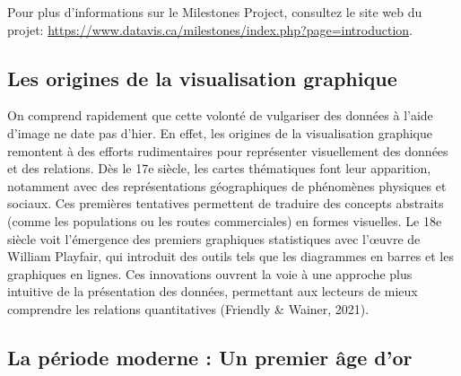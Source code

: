 \documentclass[
  letterpaper,
  DIV=11,
  numbers=noendperiod]{scrreprt}
\begin{document}
\begin{tcolorbox}[enhanced jigsaw, opacitybacktitle=0.6, colbacktitle=quarto-callout-note-color!10!white, arc=.35mm, toptitle=1mm, colframe=quarto-callout-note-color-frame, breakable, colback=white, toprule=.15mm, rightrule=.15mm, coltitle=black, bottomrule=.15mm, opacityback=0, titlerule=0mm, bottomtitle=1mm, title=\textcolor{quarto-callout-note-color}{\faInfo}\hspace{0.5em}{Note}, leftrule=.75mm, left=2mm]

Pour plus d'informations sur le Milestones Project, consultez le site
web du projet:
\url{https://www.datavis.ca/milestones/index.php?page=introduction}.

\end{tcolorbox}

\hypertarget{les-origines-de-la-visualisation-graphique}{%
\subsection{Les origines de la visualisation
graphique}\label{les-origines-de-la-visualisation-graphique}}

On comprend rapidement que cette volonté de vulgariser des données à
l'aide d'image ne date pas d'hier. En effet, les origines de la
visualisation graphique remontent à des efforts rudimentaires pour
représenter visuellement des données et des relations. Dès le 17e
siècle, les cartes thématiques font leur apparition, notamment avec des
représentations géographiques de phénomènes physiques et sociaux. Ces
premières tentatives permettent de traduire des concepts abstraits
(comme les populations ou les routes commerciales) en formes visuelles.
Le 18e siècle voit l'émergence des premiers graphiques statistiques avec
l'œuvre de William Playfair, qui introduit des outils tels que les
diagrammes en barres et les graphiques en lignes. Ces innovations
ouvrent la voie à une approche plus intuitive de la présentation des
données, permettant aux lecteurs de mieux comprendre les relations
quantitatives (Friendly \& Wainer, 2021).

\hypertarget{la-puxe9riode-moderne-un-premier-uxe2ge-dor}{%
\subsection{La période moderne : Un premier âge
d'or}\label{la-puxe9riode-moderne-un-premier-uxe2ge-dor}}
\end{document}
